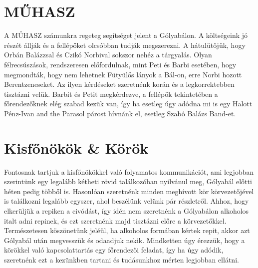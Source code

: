 \section{MŰHASZ}
\hspace{2mm} A MŰHASZ számunkra regeteg segítséget jelent a Gólyabálon. A költségeink jó részét állják és a fellépőket olcsóbban tudják megszerezni. A hátulütőjük, hogy Orbán Balázzsal és Czikó Norbival sokszor nehéz a tárgyalás. Olyan félrecsúszások, rendszeresen előfordulnak, mint Peti és Barbi esetében, hogy megmondták, hogy nem lehetnek Fütyülős lányok a Bál-on, erre Norbi hozott Berentzeneseket. Az ilyen kérdéseket szeretnénk korán és a legkorrektebben tisztázni velük. Barbit és Petit megkérdezve, a fellépők tekintetében a főrendezőknek elég szabad kezük van, így ha esetleg úgy adódna mi is egy Halott Pénz-Ivan and the Parasol párost hívnánk el, esetleg Szabó Balázs Band-et.

\section{Kisfőnökök \& Körök}
\hspace{2mm} Fontosnak tartjuk a kisfőnökökkel való folyamatos kommunikációt, ami legjobban szerintünk egy legalább kétheti rövid találkozóban nyilvánul meg, Gólyabál előtti héten pedig többől is. Hasonlóan szeretnénk minden meghívott kör körvezetőjével is találkozni legalább egyszer, ahol beszélünk velünk pár részletről. Ahhoz, hogy elkerüljük a repiken a civódást, így idén nem szeretnénk a Gólyabálon alkoholos italt adni repinek, és ezt szeretnénk majd tisztázni előre a körvezetőkkel. Természetesen köszönetünk jeléül, ha alkoholos formában kértek repit, akkor azt Gólyabál után megvesszük és odaadjuk nekik. Mindketten úgy érezzük, hogy a körökkel való kapcsolattartás egy főrendezői feladat, így ha úgy adódik, szeretnénk ezt a kezünkben tartani és tudásunkhoz mérten legjobban ellátni.